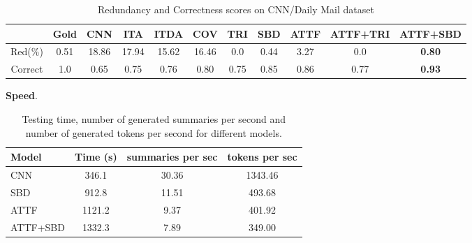 \begin{table}[th]
	\centering
	\scriptsize
	\begin{tabular}{|c|c|c|c|c|c|c|c|c|c|c|}
		\hline
	            & Gold & CNN  & ITA & ITDA & COV & TRI & SBD & ATTF & ATTF+TRI & ATTF+SBD \\
		\hline
		Red(\%) & 0.51 & 18.86 & 17.94 & 15.62 & 16.46 & 0.0 & 0.44 & 3.27 & 0.0 & \bf 0.80 \\
		Correct & 1.0 & 0.65 & 0.75 & 0.76 & 0.80 & 0.75 & 0.85 & 0.86 & 0.77 & \bf 0.93 \\
		\hline
	\end{tabular}
	\caption{Redundancy and Correctness scores on CNN/Daily Mail dataset}
	\label{tab:eval_cor}
\end{table}

\textbf{Speed}.
\begin{table}[th]
\centering
\scriptsize
\begin{tabular}{|l|c|c|c|}
\hline
Model & Time (s) & summaries per sec & tokens per sec \\
\hline
CNN &  346.1 & 30.36 & 1343.46 \\
SBD &  912.8 & 11.51 & 493.68 \\
ATTF & 1121.2 & 9.37 &  401.92 \\
ATTF+SBD & 1332.3 & 7.89 &  349.00 \\
\hline
\end{tabular}
\caption{Testing time, number of generated summaries per second and number of generated tokens per second for different models.}
\label{tab:eval_speed}
\end{table}

